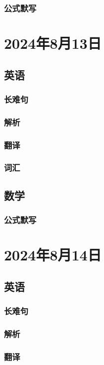\documentclass[UTF8]{ctexart}
\begin{document}
\subsubsection{公式默写}
\begin{multicols}{2}
\end{multicols}
\section{2024年8月13日}
\subsection{英语}
\subsubsection{长难句}
\subsubsection{解析}
\subsubsection{翻译}
\subsubsection{词汇}
\subsection{数学}
\subsubsection{公式默写}
\begin{multicols}{2}
\end{multicols}
\section{2024年8月14日}
\subsection{英语}
\subsubsection{长难句}
\subsubsection{解析}
\subsubsection{翻译}
\end{document}
